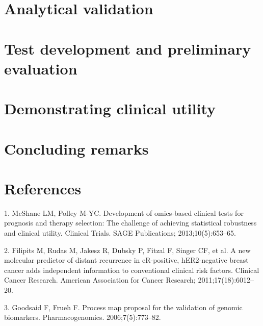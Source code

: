 \documentclass[11pt]{article}
\begin{document}
\section{Analytical validation}\label{analytical-validation}

\section{Test development and preliminary
evaluation}\label{test-development-and-preliminary-evaluation}

\section{Demonstrating clinical
utility}\label{demonstrating-clinical-utility}

\section{Concluding remarks}\label{concluding-remarks}

\section*{References}\label{references}

1. McShane LM, Polley M-YC. Development of omics-based clinical tests
for prognosis and therapy selection: The challenge of achieving
statistical robustness and clinical utility. Clinical Trials. SAGE
Publications; 2013;10(5):653--65.

2. Filipits M, Rudas M, Jakesz R, Dubsky P, Fitzal F, Singer CF, et al.
A new molecular predictor of distant recurrence in eR-positive,
hER2-negative breast cancer adds independent information to conventional
clinical risk factors. Clinical Cancer Research. American Association
for Cancer Research; 2011;17(18):6012--20.

3. Goodsaid F, Frueh F. Process map proposal for the validation of
genomic biomarkers. Pharmacogenomics. 2006;7(5):773--82.


\end{document}
